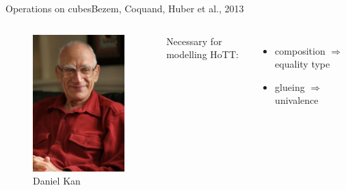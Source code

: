 \documentclass[english,draft]{beamer}
\begin{document}
\begin{frame}{Operations on cubes}{Bezem, Coquand, Huber et al., 2013}
 
\begin{columns}[c]
        \begin{center}
            \begin{figure}[h!]
                \includegraphics[height=.6\textheight]{figures/kan.jpg}
                \caption{Daniel Kan}
            \end{figure} 
        \end{center}
        
        Necessary for modelling HoTT:
        
        \begin{itemize}
         \item  composition $\Rightarrow$ equality type
         \item glueing $\Rightarrow$ univalence
        \end{itemize}



\end{columns}
\end{frame}
\end{document}
